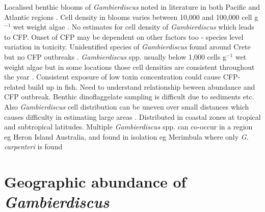 \documentclass[12pt]{article}
\begin{document}
Localised benthic blooms of \emph{Gambierdiscus} noted in literature in both Pacific and Atlantic regions \cite{nakajima1981toxicity,withers1984ciguatera,chinain1999seasonal,darius2007ciguatera}.
Cell density in blooms varies between 10,000 and 100,000 cell g$^{-1}$ wet weight algae \cite{litaker2010global}. No estimates for cell density of \emph{Gambierdiscus} which leads to CFP. Onset of CFP may be dependent on other factors too - species level variation in toxicity. Unidentified species of \emph{Gambierdiscus} found around Crete but no CFP outbreaks \cite{caillaud2010update}. %
\emph{Gambierdiscus} spp. usually below 1,000 cells g$^{-1}$ wet weight algae \cite{litaker2010global} but in some locations those cell densities are consistent throughout the year \cite{chinain1999seasonal}.
Consistent exposure of low toxin concentration could cause CFP-related build up in fish. Need to understand relationship beween abundance and CFP outbreak. Benthic dinoflaggelate sampling is difficult due to sediments etc. Also \emph{Gambierdiscus} cell distribution can be uneven over small distances which causes difficulty in estimating large areas \cite{lobel1988assessment,ballantine1988population,litaker2010global}.
Distributed in coastal zones at tropical and subtropical latitudes.
Multiple \emph{Gambierdiscus} spp. can co-occur in a region eg Heron Island Australia, and found in isolation eg Merimbula where only \emph{G. carpenteri} is found %

\section{Geographic abundance of \emph{Gambierdiscus}}
\end{document}
